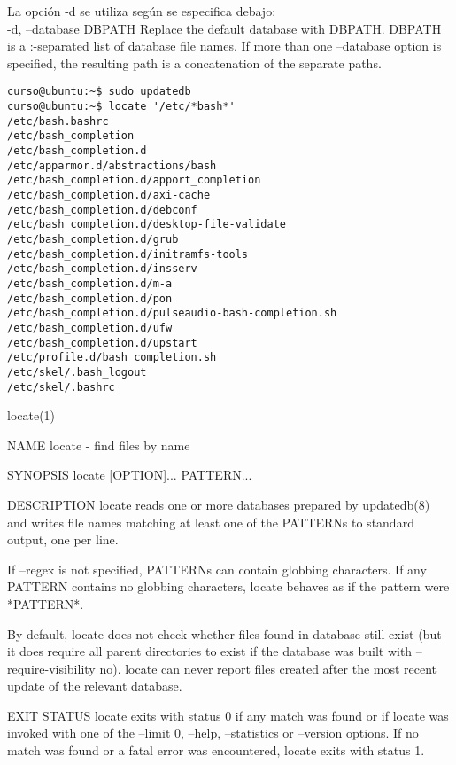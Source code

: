 \documentclass[a4paper,11pt,spanish]{article} %
\newenvironment{myscriptlisting}
{\begin{list}{}{\setlength{\leftmargin}{1em}}\item\scriptsize\bfseries}
{\end{list}}
\begin{document}
La opción -d se utiliza según se especifica debajo:\\

-d, --database DBPATH
              Replace the default database with DBPATH.  DBPATH is a :-separated list of database 
              file names.  If more than one --database option is specified, the
              resulting path is a concatenation of the separate paths.\\

\begin{myscriptlisting}
 \begin{verbatim}
curso@ubuntu:~$ sudo updatedb
curso@ubuntu:~$ locate '/etc/*bash*'
/etc/bash.bashrc
/etc/bash_completion
/etc/bash_completion.d
/etc/apparmor.d/abstractions/bash
/etc/bash_completion.d/apport_completion
/etc/bash_completion.d/axi-cache
/etc/bash_completion.d/debconf
/etc/bash_completion.d/desktop-file-validate
/etc/bash_completion.d/grub
/etc/bash_completion.d/initramfs-tools
/etc/bash_completion.d/insserv
/etc/bash_completion.d/m-a
/etc/bash_completion.d/pon
/etc/bash_completion.d/pulseaudio-bash-completion.sh
/etc/bash_completion.d/ufw
/etc/bash_completion.d/upstart
/etc/profile.d/bash_completion.sh
/etc/skel/.bash_logout
/etc/skel/.bashrc
\end{verbatim}
\end{myscriptlisting}
              
locate(1)                                                             

NAME
       locate - find files by name

SYNOPSIS
       locate [OPTION]... PATTERN...

DESCRIPTION
       locate reads one or more databases prepared by updatedb(8) and writes file names matching 
       at least one of the PATTERNs to standard output, one per line.

       If  --regex  is  not  specified, PATTERNs can contain globbing characters.  
       If any PATTERN contains no globbing characters, locate behaves as if the pattern
       were *PATTERN*.

       By default, locate does not check whether files found in database still exist (but it does 
       require all parent directories to exist if the database was built
       with --require-visibility no).  locate can never report files created after the most 
       recent update of the relevant database.

EXIT STATUS
       locate  exits  with  status  0  if any match was found or if locate was invoked with one 
       of the --limit 0, --help, --statistics or --version options.  If no
       match was found or a fatal error was encountered, locate exits with status 1.
\end{document}
